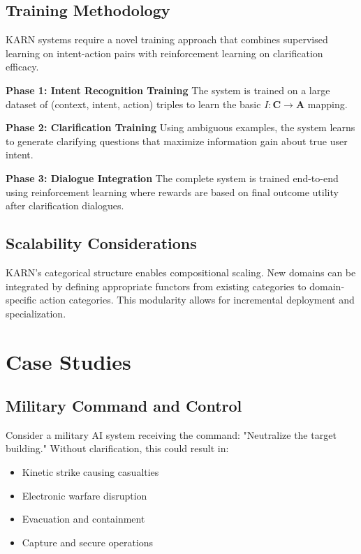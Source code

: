 \documentclass[12pt]{article}
\begin{document}
\subsection{Training Methodology}

KARN systems require a novel training approach that combines supervised learning on intent-action pairs with reinforcement learning on clarification efficacy.

\textbf{Phase 1: Intent Recognition Training}
The system is trained on a large dataset of (context, intent, action) triples to learn the basic $I: \mathbf{C} \rightarrow \mathbf{A}$ mapping.

\textbf{Phase 2: Clarification Training}  
Using ambiguous examples, the system learns to generate clarifying questions that maximize information gain about true user intent.

\textbf{Phase 3: Dialogue Integration}
The complete system is trained end-to-end using reinforcement learning where rewards are based on final outcome utility after clarification dialogues.

\subsection{Scalability Considerations}

KARN's categorical structure enables compositional scaling. New domains can be integrated by defining appropriate functors from existing categories to domain-specific action categories. This modularity allows for incremental deployment and specialization.

\section{Case Studies}

\subsection{Military Command and Control}

Consider a military AI system receiving the command: "Neutralize the target building." Without clarification, this could result in:
\begin{itemize}
\item Kinetic strike causing casualties
\item Electronic warfare disruption
\item Evacuation and containment
\item Capture and secure operations
\end{itemize}
\end{document}
